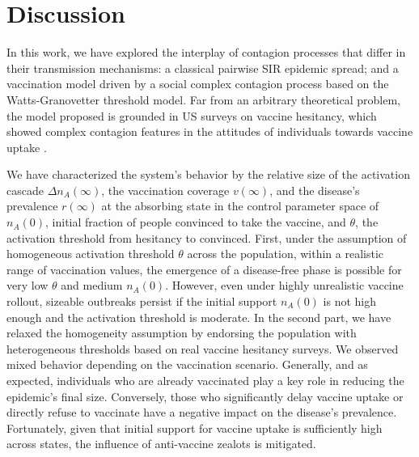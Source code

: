 \documentclass[
 reprint,
 amsmath,amssymb,
 aps,
]{revtex4-2}
\begin{document}
\section{Discussion}
\label{sec:discussion}

In this work, we have explored the interplay of contagion processes that differ in their transmission mechanisms: a classical pairwise SIR epidemic spread; and a vaccination model driven by a social complex contagion process based on the Watts-Granovetter threshold model. Far from an arbitrary theoretical problem, the model proposed is grounded in US surveys on vaccine hesitancy, which showed complex contagion features in the attitudes of individuals towards vaccine uptake \cite{lazer2021covid}.

We have characterized the system's behavior by the relative size of the activation cascade $\Delta n_A(\infty)$, the vaccination coverage $v(\infty)$, and the disease's prevalence $r(\infty)$ at the absorbing state in the control parameter space of $n_A(0)$, initial fraction of people convinced to take the vaccine, and $\theta$, the activation threshold from hesitancy to convinced. First, under the assumption of homogeneous activation threshold $\theta$ across the population, within a realistic range of vaccination values, the emergence of a disease-free phase is possible for very low $\theta$ and medium $n_A(0)$. However, even under highly unrealistic vaccine rollout, sizeable outbreaks persist if the initial support $n_A(0)$ is not high enough and the activation threshold is moderate. In the second part, we have relaxed the homogeneity assumption by endorsing the population with heterogeneous thresholds based on real vaccine hesitancy surveys. We observed mixed behavior depending on the vaccination scenario. Generally, and as expected, individuals who are already vaccinated play a key role in reducing the epidemic's final size. Conversely, those who significantly delay vaccine uptake or directly refuse to vaccinate have a negative impact on the disease's prevalence. Fortunately, given that initial support for vaccine uptake is sufficiently high across states, the influence of anti-vaccine zealots is mitigated. 
\end{document}
